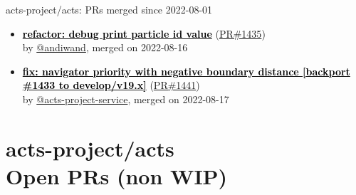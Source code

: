 \documentclass{beamer}
\begin{document}
\begin{frame}[allowframebreaks]{ acts-project/acts: PRs merged since 2022-08-01 }
\begin{itemize}
    \item
    \textbf{\href{https://github.com/acts-project/acts/pull/1435}{\textcolor{black}{refactor: debug print particle id value}}}
    (\href{https://github.com/acts-project/acts/pull/1435}{PR\#1435}) \\
    by \href{https://github.com/andiwand}{ @andiwand}, merged on 2022-08-16

    \item
    \textbf{\href{https://github.com/acts-project/acts/pull/1441}{\textcolor{black}{fix: navigator priority with negative boundary distance [backport \#1433 to develop/v19.x]}}}
    (\href{https://github.com/acts-project/acts/pull/1441}{PR\#1441}) \\
    by \href{https://github.com/acts-project-service}{ @acts-project-service}, merged on 2022-08-17

  \end{itemize}

\end{frame}



\section{ acts-project/acts \\ Open PRs (non WIP)}
\end{document}
